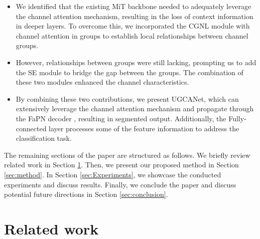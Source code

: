 \documentclass{article}
\begin{document}
\begin{itemize}
    \item We identified that the existing MiT backbone needed to adequately leverage the channel attention mechanism, resulting in the loss of context information in deeper layers. To overcome this, we incorporated the CGNL module with channel attention in groups to establish local relationships between channel groups.
    \item However, relationships between groups were still lacking, prompting us to add the SE module to bridge the gap between the groups. The combination of these two modules enhanced the channel characteristics.
    \item By combining these two contributions, we present UGCANet, which can extensively leverage the channel attention mechanism and propagate through the FaPN decoder \cite{FaPN}, resulting in segmented output. Additionally, the Fully-connected layer processes some of the feature information to address the classification task.
\end{itemize}

The remaining sections of the paper are structured as follows. We briefly review related work in Section \ref{sec:related}. Then, we present our proposed method in Section \ref{sec:method}. In Section \ref{sec:Experiments}, we showcase the conducted experiments and discuss results. Finally, we conclude the paper and discuss potential future directions in Section \ref{sec:conclusion}.

\section{Related work}
\label{sec:related}
\end{document}
